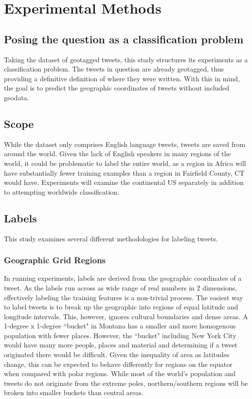 \documentclass[midd]{thesis}
\begin{document}
\chapter{Experimental Methods}

\section{Posing the question as a classification problem}
Taking the dataset of geotagged tweets, this study structures its experiments as a classification problem. The tweets in question are already geotagged, thus providing a definitive definition of where they were written. With this in mind, the goal is to predict the geographic coordinates of tweets without included geodata.

\section{Scope}
While the dataset only comprises English language tweets, tweets are saved from around the world. Given the lack of English speakers in many regions of the world, it could be problematic to label the entire world, as a region in Africa will have substantially fewer training examples than a region in Fairfield County, CT would have. Experiments will examine the continental US separately in addition to attempting worldwide classification.

\section{Labels}
This study examines several different methodologies for labeling tweets.

\subsection{Geographic Grid Regions}
In running experiments, labels are derived from the geographic coordinates of a tweet. As the labels run across as wide range of real numbers in 2 dimensions, effectively labeling the training features is a non-trivial process. The easiest way to label tweets is to break up the geographic into regions of equal latitude and longitude intervals. This, however, ignores cultural boundaries and dense areas. A 1-degree x 1-degree ``bucket" in Montana has a smaller and more homogenous population with fewer places. However, the ``bucket" including New York City would have many more people, places and material and determining if a tweet originated there would be difficult. Given the inequality of area as latitudes change, this can be expected to behave differently for regions on the equator when compared with polar regions. While most of the world's population and tweets do not originate from the extreme poles, northern/southern regions will be broken into smaller buckets than central areas.
\end{document}
